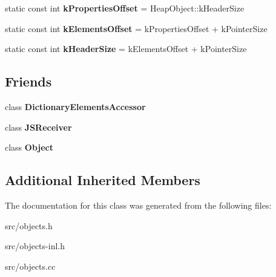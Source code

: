 \begin{DoxyCompactItemize}
\item 
\hypertarget{classv8_1_1internal_1_1_j_s_object_aa9b49e218c91312d0cd5b302b2afff31}{}static const int {\bfseries k\+Properties\+Offset} = Heap\+Object\+::k\+Header\+Size\label{classv8_1_1internal_1_1_j_s_object_aa9b49e218c91312d0cd5b302b2afff31}

\item 
\hypertarget{classv8_1_1internal_1_1_j_s_object_adbdc81f5aec6d4defbcc3099b17f5142}{}static const int {\bfseries k\+Elements\+Offset} = k\+Properties\+Offset + k\+Pointer\+Size\label{classv8_1_1internal_1_1_j_s_object_adbdc81f5aec6d4defbcc3099b17f5142}

\item 
\hypertarget{classv8_1_1internal_1_1_j_s_object_a5ba6da4d81bc33d61cafa6a5b3f1e619}{}static const int {\bfseries k\+Header\+Size} = k\+Elements\+Offset + k\+Pointer\+Size\label{classv8_1_1internal_1_1_j_s_object_a5ba6da4d81bc33d61cafa6a5b3f1e619}

\end{DoxyCompactItemize}
\subsection*{Friends}
\begin{DoxyCompactItemize}
\item 
\hypertarget{classv8_1_1internal_1_1_j_s_object_a621a705ab4677f43ae9c9ced7f46794a}{}class {\bfseries Dictionary\+Elements\+Accessor}\label{classv8_1_1internal_1_1_j_s_object_a621a705ab4677f43ae9c9ced7f46794a}

\item 
\hypertarget{classv8_1_1internal_1_1_j_s_object_a52a8ab6293af62038e1f16e7f27701f2}{}class {\bfseries J\+S\+Receiver}\label{classv8_1_1internal_1_1_j_s_object_a52a8ab6293af62038e1f16e7f27701f2}

\item 
\hypertarget{classv8_1_1internal_1_1_j_s_object_a0720b5f434e636e22a3ed34f847eec57}{}class {\bfseries Object}\label{classv8_1_1internal_1_1_j_s_object_a0720b5f434e636e22a3ed34f847eec57}

\end{DoxyCompactItemize}
\subsection*{Additional Inherited Members}


The documentation for this class was generated from the following files\+:\begin{DoxyCompactItemize}
\item 
src/objects.\+h\item 
src/objects-\/inl.\+h\item 
src/objects.\+cc\end{DoxyCompactItemize}
